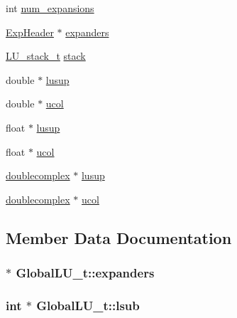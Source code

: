 \begin{DoxyCompactItemize}
\item 
int \hyperlink{structGlobalLU__t_a1923c63f76eab75f5022f025c25a82a7}{num\+\_\+expansions}
\item 
\hyperlink{slu__util_8h_ac071de4d8a39e15f13c92a5f60bc16f0}{Exp\+Header} $\ast$ \hyperlink{structGlobalLU__t_a15ba088f0bde94312a7ed6cbfecf7e67}{expanders}
\item 
\hyperlink{structLU__stack__t}{L\+U\+\_\+stack\+\_\+t} \hyperlink{structGlobalLU__t_a9c8f24b1d7ed85996df0ab869b472b0e}{stack}
\item 
double $\ast$ \hyperlink{structGlobalLU__t_a726d0a12957a3de9a841b833b8451c09}{lusup}
\item 
double $\ast$ \hyperlink{structGlobalLU__t_a7cfad10c14a658b4079b75c4d980bca8}{ucol}
\item 
float $\ast$ \hyperlink{structGlobalLU__t_a2c939400d4e502551f9b64edd27f614a}{lusup}
\item 
float $\ast$ \hyperlink{structGlobalLU__t_a2542f90c18839f310699cb3e4722626f}{ucol}
\item 
\hyperlink{structdoublecomplex}{doublecomplex} $\ast$ \hyperlink{structGlobalLU__t_a2a029c0f5964a535c8ec85911987b639}{lusup}
\item 
\hyperlink{structdoublecomplex}{doublecomplex} $\ast$ \hyperlink{structGlobalLU__t_a3fbdc21b78d160d4cbe9f4c435381586}{ucol}
\end{DoxyCompactItemize}


\subsection{Member Data Documentation}
\hypertarget{structGlobalLU__t_a15ba088f0bde94312a7ed6cbfecf7e67}{}
\subsubsection[{expanders}]{ $\ast$ Global\+L\+U\+\_\+t\+::expanders}\label{structGlobalLU__t_a15ba088f0bde94312a7ed6cbfecf7e67}
\hypertarget{structGlobalLU__t_a826aa0459fee745ec40cd8d7c31ddcbd}{}
\subsubsection[{lsub}]{\setlength{\rightskip}{0pt plus 5cm}int $\ast$ Global\+L\+U\+\_\+t\+::lsub}\label{structGlobalLU__t_a826aa0459fee745ec40cd8d7c31ddcbd}
\hypertarget{structGlobalLU__t_a726d0a12957a3de9a841b833b8451c09}{}
